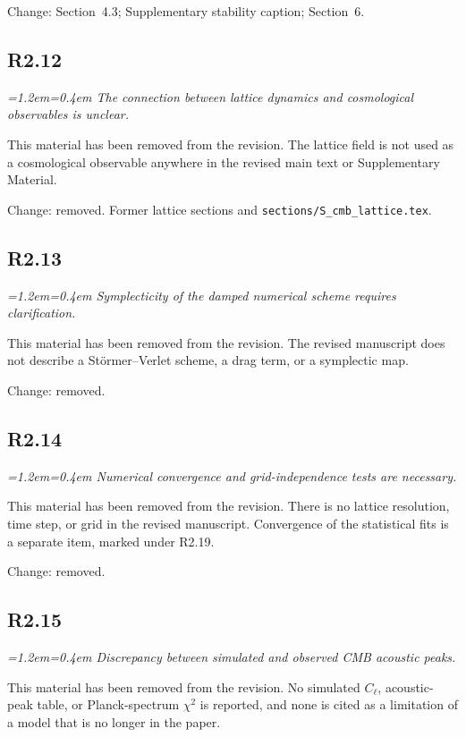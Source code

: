 \documentclass[11pt,a4paper]{article}
\newenvironment{review}{\par\color{revcolor}\itshape\leftskip=1.2em\rightskip=0.4em\noindent}{\par\leftskip=0pt\rightskip=0pt}
\begin{document}
Change: Section~4.3; Supplementary stability caption; Section~6.

\subsection*{R2.12}
\begin{review}
The connection between lattice dynamics and cosmological observables is unclear.
\end{review}

This material has been removed from the revision.
The lattice field is not used as a cosmological observable anywhere in the revised main text or Supplementary Material.

Change: removed. Former lattice sections and \texttt{sections/S\_cmb\_lattice.tex}.

\subsection*{R2.13}
\begin{review}
Symplecticity of the damped numerical scheme requires clarification.
\end{review}

This material has been removed from the revision.
The revised manuscript does not describe a St\"ormer--Verlet scheme, a drag term, or a symplectic map.

Change: removed.

\subsection*{R2.14}
\begin{review}
Numerical convergence and grid-independence tests are necessary.
\end{review}

This material has been removed from the revision.
There is no lattice resolution, time step, or grid in the revised manuscript.
Convergence of the statistical fits is a separate item, marked under R2.19.

Change: removed.

\subsection*{R2.15}
\begin{review}
Discrepancy between simulated and observed CMB acoustic peaks.
\end{review}

This material has been removed from the revision.
No simulated $C_\ell$, acoustic-peak table, or Planck-spectrum $\chi^2$ is reported, and none is cited as a limitation of a model that is no longer in the paper.
\end{document}
